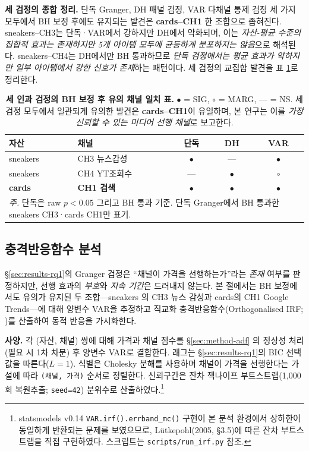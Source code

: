 \documentclass[11pt, a4paper, twocolumn]{article}
\begin{document}
\noindent\textbf{세 검정의 종합 정리.} 단독 Granger, DH 패널 검정,
VAR 다채널 통제 검정 세 가지 모두에서 BH 보정 후에도 유지되는 발견은
\textbf{cards--CH1} 한 조합으로 좁혀진다. sneakers--CH3는 단독·VAR에서
강하지만 DH에서 약화되며, 이는 \emph{자산-평균 수준의 집합적 효과는
존재하지만 5개 아이템 모두에 균등하게 분포하지는 않음}으로 해석된다.
sneakers--CH4는 DH에서만 BH 통과하므로 \emph{단독 검정에서는 평균
효과가 약하지만 일부 아이템에서 강한 신호가 존재}하는 패턴이다. 세 검정의
교집합 발견을 표 \ref{tab:three_tests}로 정리한다.

\begin{table}[!tbp]
\centering\small
\caption[세 인과 검정의 BH 보정 후 일치]{\textbf{세 인과 검정의 BH
보정 후 유의 채널 일치 표.} $\bullet$ = SIG, $\circ$ = MARG, --- = NS.
세 검정 모두에서 일관되게 유의한 발견은 \textbf{cards--CH1}이 유일하며,
본 연구는 이를 \emph{가장 신뢰할 수 있는 미디어 선행 채널}로 보고한다.}
\label{tab:three_tests}
\begin{tabular}{llccc}
\toprule
자산 & 채널 & 단독 & DH & VAR \\
\midrule
sneakers & CH3 뉴스감성 & $\bullet$ & --- & $\bullet$ \\
sneakers & CH4 YT조회수 & --- & $\bullet$ & $\circ$ \\
\textbf{cards} & \textbf{CH1 검색} & $\bullet$ & $\bullet$ & $\bullet$ \\
\bottomrule
\multicolumn{5}{p{0.9\columnwidth}}{\textit{주.} 단독은 raw $p<0.05$ 그리고 BH 통과 기준. 단독 Granger에서 BH 통과한 sneakers CH3·cards CH1만 표기.}
\end{tabular}
\end{table}

\subsection{충격반응함수 분석}\label{sec:results-irf}

\S\ref{sec:results-rq1}의 Granger 검정은 ``채널이 가격을 선행하는가''라는
\emph{존재} 여부를 판정하지만, 선행 효과의 \emph{부호}와 \emph{지속 기간}은
드러내지 않는다. 본 절에서는 BH 보정에서도 유의가 유지된 두 조합---sneakers
의 CH3 뉴스 감성과 cards의 CH1 Google Trends---에 대해 양변수 VAR을 추정하고
직교화 충격반응함수(Orthogonalised IRF; \citealp{lutkepohl2005})를 산출하여
동적 반응을 가시화한다.

\textbf{사양.} 각 (자산, 채널) 쌍에 대해 가격과 채널 점수를 \S\ref{sec:method-adf}
의 정상성 처리(필요 시 1차 차분) 후 양변수 VAR로 결합한다. 래그는
\S\ref{sec:results-rq1}의 BIC 선택값을 따른다($L=1$). 식별은 Cholesky
분해를 사용하며 채널이 가격을 선행한다는 가설에 따라 \texttt{(채널, 가격)}
순서로 정렬한다. 신뢰구간은 잔차 잭나이프 부트스트랩(1{,}000회 복원추출;
\texttt{seed=42}) 분위수로 산출하였다.\footnote{statsmodels v0.14
\texttt{VAR.irf().errband\_mc()} 구현이 본 분석 환경에서
상하한이 동일하게 반환되는 문제를 보였으므로, Lütkepohl(2005, §3.5)에 따른
잔차 부트스트랩을 직접 구현하였다. 스크립트는
\texttt{scripts/run\_irf.py} 참조.}
\end{document}
